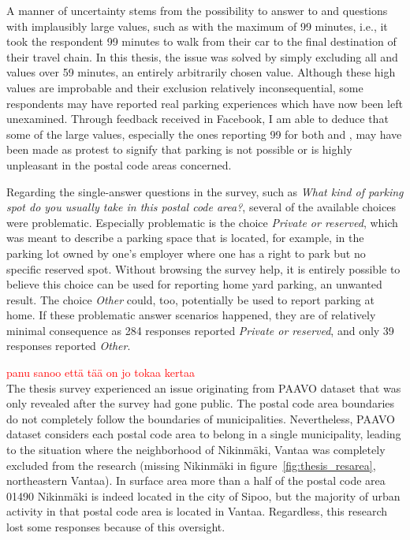 A manner of uncertainty stems from the possibility to answer to  and  questions with implausibly large values, such as with the maximum of 99 minutes, i.e., it took the respondent 99 minutes to walk from their car to the final destination of their travel chain. In this thesis, the issue was solved by simply excluding all  and  values over 59 minutes, an entirely arbitrarily chosen value. Although these high values are improbable and their exclusion relatively inconsequential, some respondents may have reported real parking experiences which have now been left unexamined. Through feedback received in Facebook, I am able to deduce that some of the large values, especially the ones reporting 99 for both  and , may have been made as protest to signify that parking is not possible or is highly unpleasant in the postal code areas concerned.

Regarding the single-answer questions in the survey, such as \textit{What kind of parking spot do you usually take in this postal code area?}, several of the available choices were problematic. Especially problematic is the choice \textit{Private or reserved}, which was meant to describe a parking space that is located, for example, in the parking lot owned by one's employer where one has a right to park but no specific reserved spot. Without browsing the survey help, it is entirely possible to believe this choice can be used for reporting home yard parking, an unwanted result. The choice \textit{Other} could, too, potentially be used to report parking at home. If these problematic  answer scenarios happened, they are of relatively minimal consequence as 284 responses reported \textit{Private or reserved}, and only 39 responses reported \textit{Other}.

\textcolor{red}{panu sanoo että tää on jo tokaa kertaa} \\
The thesis survey experienced an issue originating from PAAVO dataset that was only revealed after the survey had gone public. The postal code area boundaries do not completely follow the boundaries of municipalities. Nevertheless, PAAVO dataset considers each postal code area to belong in a single municipality, leading to the situation where the neighborhood of Nikinmäki, Vantaa was completely excluded from the research (missing Nikinmäki in figure~\ref{fig:thesis_resarea}, northeastern Vantaa). In surface area more than a half of the postal code area 01490 Nikinmäki is indeed located in the city of Sipoo, but the majority of urban activity in that postal code area is located in Vantaa. Regardless, this research lost some responses because of this oversight.

